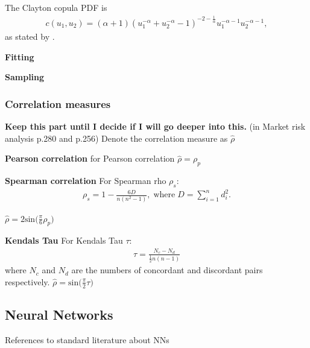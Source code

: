The Clayton copula \gls{PDF} is 
\begin{align*}
    c(u_1,u_2) = (\alpha+1)(u_1^{-\alpha}+u_2^{-\alpha}-1)^{-2- \frac{1}{\alpha}}u_1^{-\alpha -1} u_2^{-\alpha -1},
\end{align*}
as stated by \citet[p.~272]{Alexander2008}. 

\textbf{Fitting}


\textbf{Sampling}


\subsubsection{Correlation measures}
\textbf{Keep this part until I decide if I will go deeper into this.}
(in Market risk analysis p.280 and p.256)
Denote the correlation measure as $\hat{\rho}$

\textbf{Pearson correlation}
for Pearson correlation
$\hat{\rho} = \rho_p$

\textbf{Spearman correlation}
For Spearman rho $\rho_s$:
\begin{align*}
    \rho_s = 1-\frac{6D}{n(n^2-1)},\; \mathrm{where} \; D=\sum_ {i=1}^nd_i^2.
\end{align*}

$\hat{\rho} =2\mathrm{sin} \big ( \frac{\pi}{6}\rho_p \big)$

\textbf{Kendals Tau}
For Kendals Tau $\tau$:
\begin{align*}
    \tau = \frac{N_c-N_d}{\frac{1}{2}n(n-1)}
\end{align*}
where $N_c$ and $N_d$ are the numbers of concordant and discordant pairs respectively.
$\hat{\rho} = \mathrm{sin}\big(\frac{\pi}{2}\tau \big) $

\subsection{Neural Networks}
References to standard literature about NNs





